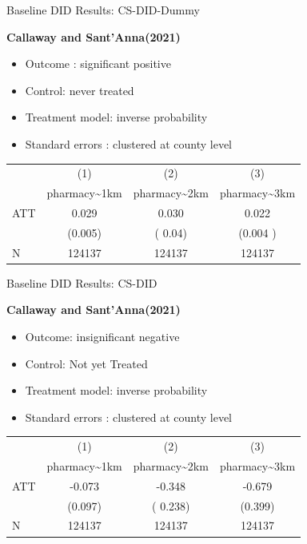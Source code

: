 \documentclass{beamer}
\begin{document}
\begin{frame}{Baseline DID Results: CS-DID-Dummy}

\textbf{Callaway and Sant'Anna(2021)}

\begin{itemize}
    \item Outcome : significant positive
    \item Control: never treated
    \item Treatment model: inverse probability
    \item Standard errors : clustered at  county level
\end{itemize}

\vspace{0.5em}
\centering
\footnotesize
\begin{tabular}{lccc}
\toprule
 & (1) & (2) & (3) \\
 & pharmacy\textasciitilde 1km & pharmacy\textasciitilde 2km & pharmacy\textasciitilde 3km \\
\midrule
ATT &  0.029  &   0.030      &    0.022     \\
    & (0.005) &   ( 0.04)       &  (0.004 )      \\
\midrule
N   &  124137   & 124137   & 124137  \\
\bottomrule
\end{tabular}


\end{frame}



\begin{frame}{Baseline DID Results: CS-DID}

\textbf{Callaway and Sant'Anna(2021)}

\begin{itemize}
    \item Outcome: insignificant negative
    \item Control:  Not yet Treated
    \item Treatment model: inverse probability
    \item Standard errors : clustered at  county level
\end{itemize}

\vspace{0.5em}
\centering
\footnotesize
\begin{tabular}{lccc}
\toprule
 & (1) & (2) & (3) \\
 & pharmacy\textasciitilde 1km & pharmacy\textasciitilde 2km & pharmacy\textasciitilde 3km \\
\midrule
ATT &  -0.073  &   -0.348       &    -0.679      \\
    & (0.097) &   ( 0.238)       &  (0.399)      \\
\midrule
N   &  124137   & 124137   & 124137  \\
\bottomrule
\end{tabular}


\end{frame}
\end{document}
